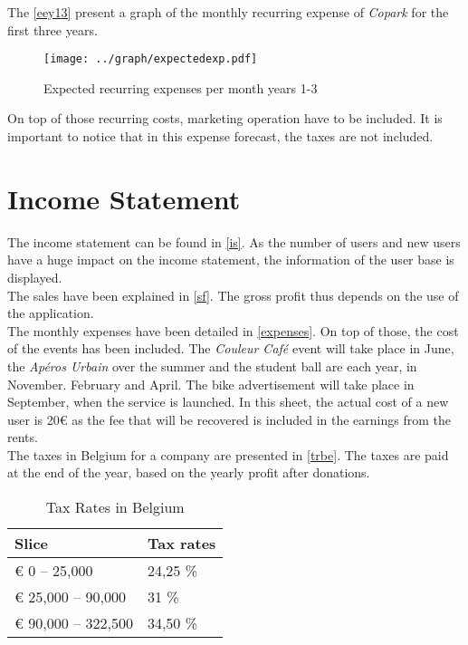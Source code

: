 \documentclass[12pt,a4paper,oneside]{book}
\newcommand{\bp}{\textit{Copark}}
\begin{document}
The \autoref{eey13} present a graph of the monthly recurring expense of \bp{} for the first three years.

\begin{figure}[h]
\centering
\caption{Expected recurring expenses per month years 1-3}
\label{eey13}
\texttt{[image: ../graph/expectedexp.pdf]}
\end{figure}

On top of those recurring costs, marketing operation have to be included. It is important to notice that in this expense forecast, the taxes are not included.

\section{Income Statement}

The income statement can be found in \autoref{is}. As the number of users and new users have a huge impact on the income statement, the information of the user base is displayed.\\

The sales have been explained in \autoref{sf}. The gross profit thus depends on the use of the application.\\

The monthly expenses have been detailed in \autoref{expenses}. On top of those, the cost of the events has been included. The \textit{Couleur Café} event will take place in June, the \textit{Apéros Urbain} over the summer and the student ball are each year, in November. February and April. The bike advertisement will take place in September, when the service is launched. In this sheet, the actual cost of a new user is 20\euro{} as the fee that will be recovered is included in the earnings from the rents.\\

The taxes in Belgium for a company are presented in \autoref{trbe}. The taxes are paid at the end of the year, based on the yearly profit after donations.

\begin{table}[ht]
\centering
\caption{Tax Rates in Belgium\cite{trbe}}
\label{trbe}
\begin{tabular}{@{}ll@{}}
\toprule
\textbf{Slice}     & \textbf{Tax rate}s \\ \midrule
\euro{} 0 – 25,000       & 24,25 \%          \\
\euro{} 25,000 – 90,000  & 31 \%             \\
\euro{} 90,000 – 322,500 & 34,50 \%          \\ \bottomrule
\end{tabular}
\end{table}
\end{document}
